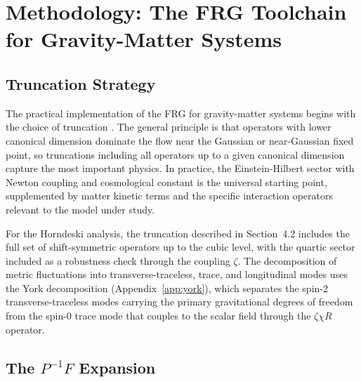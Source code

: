 \documentclass[12pt,a4paper]{article}
\begin{document}
\section{Methodology: The FRG Toolchain for Gravity-Matter Systems}
\label{sec:method}

\subsection{Truncation Strategy}

The practical implementation of the FRG for gravity-matter systems begins with
the choice of truncation \cite{Berges2002,Pawlowski2007,Dupuis2021}. The
general principle is that operators with lower canonical dimension dominate
the flow near the Gaussian or near-Gaussian fixed point, so truncations
including all operators up to a given canonical dimension capture the most
important physics. In practice, the Einstein-Hilbert sector with Newton
coupling and cosmological constant is the universal starting point,
supplemented by matter kinetic terms and the specific interaction operators
relevant to the model under study.

For the Horndeski analysis, the truncation described in Section~4.2 includes
the full set of shift-symmetric operators up to the cubic level, with the
quartic sector included as a robustness check through the coupling $\zeta$.
The decomposition of metric fluctuations into transverse-traceless, trace, and
longitudinal modes uses the York decomposition (Appendix~\ref{app:york}),
which separates the spin-2 transverse-traceless modes carrying the primary
gravitational degrees of freedom from the spin-0 trace mode that couples to
the scalar field through the $\zeta\chi R$ operator.

\subsection{The $P^{-1}F$ Expansion}
\end{document}

